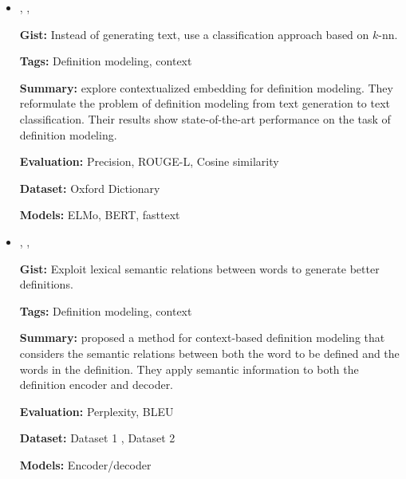 \documentclass{article}[a4paper]
\newcommand{\bitem}[2]{
    \item[\cite{#1}]
        \citetitle{#1}, \citeauthor{#1}, \citeyear{#1}
        \newline
        {#2}
}%
\begin{document}
\begin{itemize}
    \bitem{chang_what_2019}%
    {%
        \textbf{Gist:}
        Instead of generating text, use a classification approach based on
        $k$-nn.

        \textbf{Tags:}
        Definition modeling, context

        \textbf{Summary:}
        \citeauthor{chang_what_2019} explore contextualized embedding for
        definition modeling. They reformulate the problem of definition modeling
        from text generation to text classification. Their results show
        state-of-the-art performance on the task of definition modeling.

        \textbf{Evaluation:}
        Precision, ROUGE-L, Cosine similarity

        \textbf{Dataset:}
        Oxford Dictionary

        \textbf{Models:}
        ELMo, BERT, fasttext
    }%

    \bitem{washio_bridging_2019}%
    {%
        \textbf{Gist:}
        Exploit lexical semantic relations between words to generate better
        definitions.

        \textbf{Tags:}
        Definition modeling, context

        \textbf{Summary:}
        \citeauthor{washio_bridging_2019} proposed a method for context-based
        definition modeling that considers the semantic relations between both
        the word to be defined and the words in the definition. They apply
        semantic information to both the definition encoder and decoder.

        \textbf{Evaluation:}
        Perplexity, BLEU

        \textbf{Dataset:}
        Dataset 1 \cite{noraset_definition_2016},
        Dataset 2 \cite{gadetsky_conditional_2018}

        \textbf{Models:}
        Encoder/decoder
    }%
\end{itemize}
\end{document}
